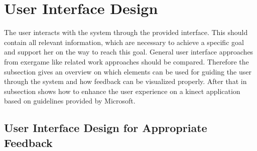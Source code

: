 \section{User Interface Design}\label{2_4_UIDesign}
The user interacts with the system through the provided interface. This should contain all relevant information, which are necessary to achieve a specific goal and support her on the way to reach this goal. General user interface approaches from exergame like related work approaches should be compared. Therefore the subsection \textit{} gives an overview on which elements can be used for guiding the user through the system and how feedback can be visualized properly. After that in subsection \textit{} shows how to enhance the user experience on a kinect application based on guidelines provided by Microsoft.

\subsection{User Interface Design for Appropriate Feedback}\label{2_5_1_userInterfacefeedback}

